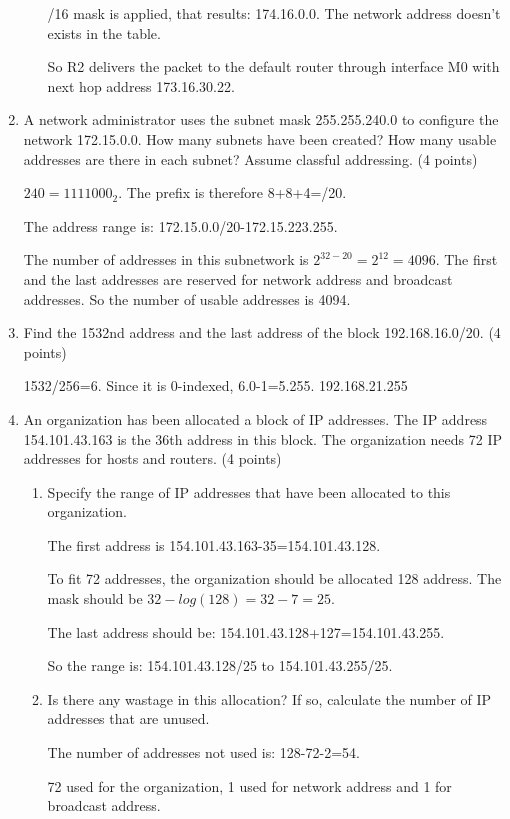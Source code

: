 \documentclass{article}
\begin{document}
\begin{enumerate}
\begin{enumerate}
    /16 mask is applied, that results: 174.16.0.0. The network address doesn't exists in the table.

    So R2 delivers the packet to the default router through interface M0 with next hop address 173.16.30.22.
  \end{enumerate}
  \item A network administrator uses the subnet mask 255.255.240.0 to configure the network 172.15.0.0.
  How many subnets have been created? How many usable addresses are there in each subnet? Assume classful addressing. (4 points)

  $240=1111000_2$. The prefix is therefore 8+8+4=/20.

  The address range is: 172.15.0.0/20-172.15.223.255.

  The number of addresses in this subnetwork is $2^{32-20}=2^12=4096$.
  The first and the last addresses are reserved for network address and broadcast addresses.
  So the number of usable addresses is 4094.

  \item Find the 1532nd address and the last address of the block 192.168.16.0/20. (4 points)

  1532/256=6. Since it is 0-indexed, 6.0-1=5.255.
  192.168.21.255

  \item An organization has been allocated a block of IP addresses.
  The IP address 154.101.43.163 is the 36th address in this block.
  The organization needs 72 IP addresses for hosts and routers. (4 points)
  \begin{enumerate}
    \item Specify the range of IP addresses that have been allocated to this organization.

    The first address is 154.101.43.163-35=154.101.43.128.
    
    To fit 72 addresses, the organization should be allocated 128 address. The mask should be $32-log(128)=32-7=25$.

    The last address should be: 154.101.43.128+127=154.101.43.255.

    So the range is: 154.101.43.128/25 to 154.101.43.255/25.
    
    \item Is there any wastage in this allocation? If so, calculate the number of IP addresses that are unused.

    The number of addresses not used is: 128-72-2=54.

    72 used for the organization, 1 used for network address and 1 for broadcast address.
  \end{enumerate}


\end{enumerate}
\end{document}
